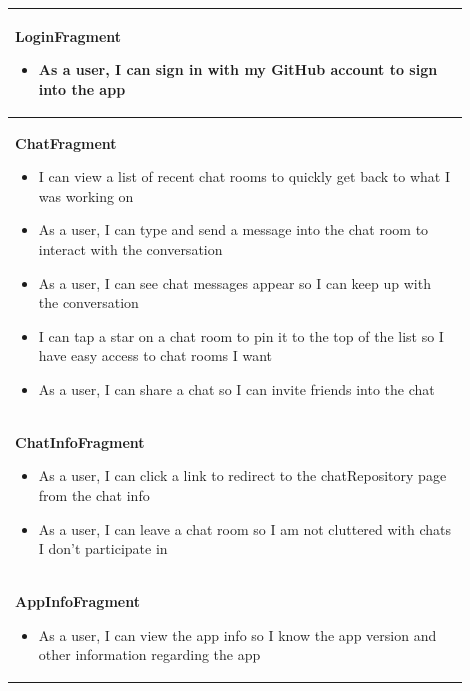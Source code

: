 \documentclass{report}
\begin{document}
\begin{center}
    \begin{tabular}{ | p{0.9\linewidth} |}
    \hline
    \textbf{LoginFragment} \begin{itemize}
                               \item As a user, I can sign in with my GitHub account to sign into the app
                           \end{itemize}                                                       \\
    \hline
    \textbf{ChatFragment} \begin{itemize}
                              \item I can view a list of recent chat rooms to quickly get back to what I was working on
                              \item As a user, I can type and send a message into the chat room to interact with the conversation
                              \item As a user, I can see chat messages appear so I can keep up with the conversation
                              \item I can tap a star on a chat room to pin it to the top of the list so I have easy access to chat rooms I want
                              \item As a user, I can share a chat so I can invite friends into the chat
                          \end{itemize}                 \\
    \hline
    \textbf{ChatInfoFragment} \begin{itemize}
                                  \item As a user, I can click a link to redirect to the chatRepository page from the chat info
                                  \item As a user, I can leave a chat room so I am not cluttered with chats I don't participate in
                              \end{itemize}                                     \\
    \hline
    \textbf{AppInfoFragment} \begin{itemize}
                                 \item As a user, I can view the app info so I know the app version and other information regarding the app
                             \end{itemize}                     \\

\end{tabular}
\end{center}
\end{document}
